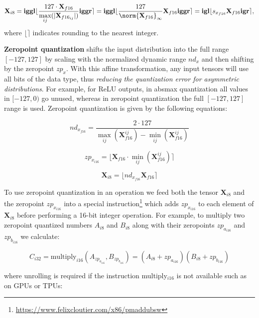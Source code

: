 \[ \mathbf{X}_{i8} = \mathbf{iggl}{\lfloor}{\dfrac{127\cdot\mathbf{X}_{f16}}{\max\limits_{ij}(|\mathbf{X}_{f16_{ij}}|)}}\mathbf{iggr}{\rceil}= \mathbf{iggl}{\lfloor}{\dfrac{127}{\norm{\mathbf{X}_{f16}}_\infty}\mathbf{X}_{f16}}\mathbf{iggr}{\rceil} = \mathbf{igl}{\lfloor}{s_{x_{f16}} \mathbf{X}_{f16}}\mathbf{igr}{\rceil},\]
where $\lfloor{} \rceil{}$ indicates rounding to the nearest integer.

\textbf{Zeropoint quantization} shifts the input distribution into the full range $[-127, 127]$ by scaling with the normalized dynamic range $nd_x$ and then shifting by the zeropoint $zp_x$. With this affine transformation, any input tensors will use all bits of the data type, thus {\it reducing the quantization error for asymmetric distributions}. For example, for ReLU outputs, in absmax quantization all values in $[-127, 0)$ go unused, whereas in zeropoint quantization the full $[-127, 127]$ range is used. Zeropoint quantization is given by the following equations:

\begin{equation}
nd_{x_{f16}} = \dfrac{2\cdot 127}{\max\limits_{ij}(\mathbf{X}_{f16}^{ij}) - \min\limits_{ij}(\mathbf{X}_{f16}^{ij})}
\end{equation}

\begin{equation}
zp_{x_{i16}} = \bigl\lfloor{\mathbf{X}_{f16} \cdot \min\limits_{ij}(\mathbf{X}_{f16}^{ij})\bigr\rceil}
\end{equation}

\begin{equation}
\mathbf{X}_{i8} = \bigl\lfloor{{nd_{x_{f16}} \mathbf{X}_{f16}}\bigr\rceil}
\end{equation}

To use zeropoint quantization in an operation we feed both the tensor $\mathbf{X}_{i8}$ and the zeropoint $zp_{x_{i16}}$ into a special instruction\footnote{\url{https://www.felixcloutier.com/x86/pmaddubsw}} which adds $zp_{x_{i16}}$ to each element of $\mathbf{X}_{i8}$ before performing a 16-bit integer operation. For example, to multiply two zeropoint quantized numbers $A_{i8}$ and $B_{i8}$ along with their zeropoints $zp_{a_{i16}}$ and $zp_{b_{i16}}$ we calculate:

\begin{equation}
C_{i32}  = \text{multiply}_{i16}({A}_{zp_{a_{i16}}},{B}_{zp_{b_{i16}}}) = ({A}_{i8}+zp_{a_{i16}})({B}_{i8}+zp_{b_{i16}})
\end{equation}

where unrolling is required if the instruction multiply$_{i16}$ is not available such as on GPUs or TPUs:


